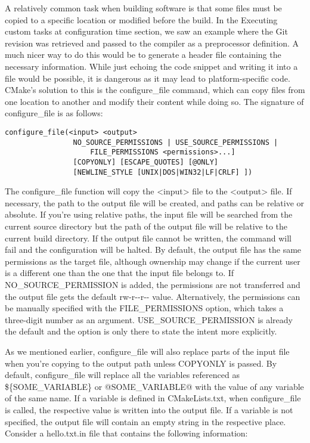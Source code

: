 A relatively common task when building software is that some files must be copied to a specific location or modified before the build. In the Executing custom tasks at configuration time section, we saw an example where the Git revision was retrieved and passed to the compiler as a preprocessor definition. A much nicer way to do this would be to generate a header file containing the necessary information. While just echoing the code snippet and writing it into a file would be possible, it is dangerous as it may lead to platform-specific code. CMake's solution to this is the configure\_file command, which can copy files from one location to another and modify their content while doing so. The signature of configure\_file is as follows:

\begin{lstlisting}[style=styleCMake]
configure_file(<input> <output>
				NO_SOURCE_PERMISSIONS | USE_SOURCE_PERMISSIONS |
					FILE_PERMISSIONS <permissions>...]
				[COPYONLY] [ESCAPE_QUOTES] [@ONLY]
				[NEWLINE_STYLE [UNIX|DOS|WIN32|LF|CRLF] ])
\end{lstlisting}

The configure\_file function will copy the <input> file to the <output> file. If necessary, the path to the output file will be created, and paths can be relative or absolute. If you're using relative paths, the input file will be searched from the current source directory but the path of the output file will be relative to the current build directory. If the output file cannot be written, the command will fail and the configuration will be halted. By default, the output file has the same permissions as the target file, although ownership may change if the current user is a different one than the one that the input file belongs to. If NO\_SOURCE\_PERMISSION is added, the permissions are not transferred and the output file gets the default rw-r-{}-r-{}- value. Alternatively, the permissions can be manually specified with the FILE\_PERMISSIONS option, which takes a three-digit number as an argument. USE\_SOURCE\_PERMISSION is already the default and the option is only there to state the intent more explicitly.

As we mentioned earlier, configure\_file will also replace parts of the input file when you're copying to the output path unless COPYONLY is passed. By default, configure\_file will replace all the variables referenced as \$\{SOME\_VARIABLE\} or @SOME\_VARIABLE@ with the value of any variable of the same name. If a variable is defined in CMakeLists.txt, when configure\_file is called, the respective value is written into the output file. If a variable is not specified, the output file will contain an empty string in the respective place. Consider a hello.txt.in file that contains the following information:


